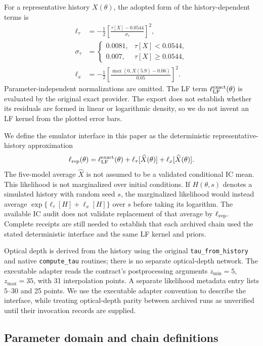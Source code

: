 For a representative history $X(\theta)$, the adopted form of the history-dependent terms is
\begin{align}
\ell_\tau&=-\frac{1}{2}\left[\frac{\tau[X]-0.0544}{\sigma_\tau}\right]^2,\\
\sigma_\tau&=\begin{cases}0.0081,&\tau[X]<0.0544,\\0.007,&\tau[X]\geq0.0544,\end{cases}\\
\ell_x&=-\frac{1}{2}\left[\frac{\max(0,X(5.9)-0.06)}{0.05}\right]^2.
\end{align}
Parameter-independent normalizations are omitted. The LF term $\ell_{\rm LF}^{\rm exact}(\theta)$ is evaluated by the original exact provider. The export does not establish whether its residuals are formed in linear or logarithmic density, so we do not invent an LF kernel from the plotted error bars.

We define the emulator interface in this paper as the deterministic representative-history approximation
\begin{equation}
\ell_{\rm rep}(\theta)=\ell_{\rm LF}^{\rm exact}(\theta)
+\ell_\tau[\widehat X(\theta)]+\ell_x[\widehat X(\theta)].
\end{equation}
The five-model average $\widehat X$ is not assumed to be a validated conditional IC mean. This likelihood is not marginalized over initial conditions. If $H(\theta,s)$ denotes a simulated history with random seed $s$, the marginalized likelihood would instead average $\exp\{\ell_\tau[H]+\ell_x[H]\}$ over $s$ before taking its logarithm. The available IC audit does not validate replacement of that average by $\ell_{\rm rep}$. Complete receipts are still needed to establish that each archived chain used the stated deterministic interface and the same LF kernel and priors.

Optical depth is derived from the history using the original \texttt{tau\_from\_history} and native \texttt{compute\_tau} routines; there is no separate optical-depth network. The executable adapter reads the contract's postprocessing arguments $z_{\min}=5$, $z_{\max}=35$, with 31 interpolation points. A separate likelihood metadata entry lists $5$--$30$ and 25 points. We use the executable adapter convention to describe the interface, while treating optical-depth parity between archived runs as unverified until their invocation records are supplied.

\subsection{Parameter domain and chain definitions}\label{parameter-domain-and-chain-definitions}


